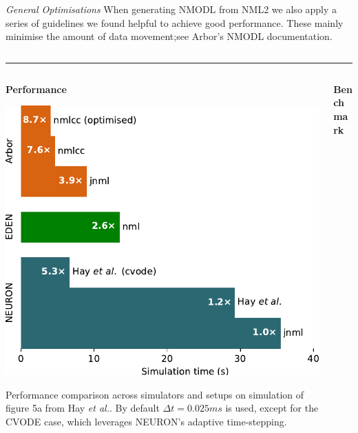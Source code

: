 \documentclass{beamer}
\begin{document}
\begin{frame}[t, fragile]
\begin{columns}[t]
\begin{column}{0.49\textwidth}
      \emph{General Optimisations} When generating NMODL from NML2 we also apply
      a series of guidelines we found helpful to achieve good performance. These
      mainly minimise the amount of data movement;\@ see Arbor's NMODL
      documentation.
    \end{column}
  \end{columns}
  \vspace*{1ex}
  \textcolor{arborange}{\rule{\textwidth}{0.5ex}}
  \vspace*{-1ex}
  \begin{columns}
    \begin{column}{0.73\textwidth}
      \begin{columns}[t]
        \begin{column}[t]{0.45\textwidth}
          \textbf{Performance}
          \vspace*{1ex}

          \includegraphics[width=\textwidth]{./benchmark/barchart_cropped.pdf}

          Performance comparison across simulators and setups on simulation of
          figure 5a from Hay \emph{et al.}. By default $\Delta t = 0.025ms$ is used,
          except for the CVODE case, which leverages NEURON's adaptive time-stepping.
        \end{column}
        \begin{column}[t]{0.54\textwidth}
          \textbf{Benchmark}


\end{column}
\end{columns}
\end{column}
\end{columns}
\end{frame}
\end{document}

